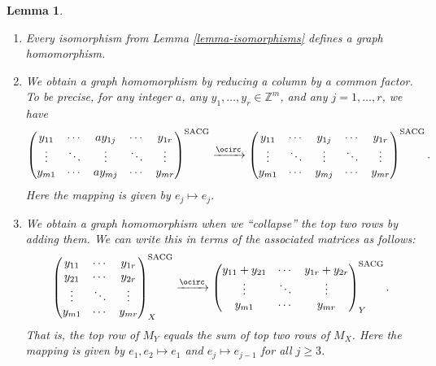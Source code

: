 \documentclass{article}
\newtheorem{Lem}[Thm]{Lemma}
\theoremstyle{definition}
\theoremstyle{remark}
\begin{document}
\begin{Lem}\label{lemma-homomorphisms}\;

\begin{enumerate}

\item Every isomorphism from Lemma \ref{lemma-isomorphisms} defines a graph homomorphism.

\item\label{lemma-homomorphisms-reduce-factor} We obtain a graph homomorphism by reducing a column by a common factor.  To be precise, for any integer $a$, any  $y_1,\dots,y_r\in \mathbb{Z}^m$, and any $j=1,\dots,r$, we have \[
\begin{pmatrix}y_{11} & \cdots & ay_{1j} & \cdots & y_{1r}\\
\vdots & \ddots & \vdots & \ddots & \vdots \\
y_{m1} & \cdots & ay_{mj} & \cdots &  y_{mr}\end{pmatrix}^{\text{SACG}}
    \xrightarrow{\ocirc}
    \begin{pmatrix}y_{11} & \cdots & y_{1j} & \cdots & y_{1r}\\
\vdots & \ddots & \vdots & \ddots & \vdots \\
y_{m1} & \cdots & y_{mj} & \cdots &  y_{mr}\end{pmatrix}^{\text{SACG}}.
\]  Here the mapping is given by $e_j\mapsto e_j$.

\item\label{lemma-homomorphisms-add-rows} We obtain a graph homomorphism when we ``collapse'' the top two rows by adding them.  We can write this in terms of the associated matrices as follows:\[
\begin{pmatrix}y_{11} & \cdots & y_{1r}\\
y_{21} & \cdots & y_{2r}\\
\vdots & \ddots & \vdots \\
y_{m1} & \cdots & y_{mr}\end{pmatrix}^{\text{SACG}}_X
    \xrightarrow{\ocirc}
    \begin{pmatrix}
    y_{11}+y_{21} & \cdots & y_{1r}+y_{2r}\\
\vdots & \ddots & \vdots \\
y_{m1} & \cdots & y_{mr}
    \end{pmatrix}^{\text{SACG}}_Y.
\]That is, the top row of $M_Y$ equals the sum of top two rows of $M_X$.  Here the mapping is given by $e_1, e_2\mapsto e_1$ and $e_j\mapsto e_{j-1}$ for all $j\geq 3$.

\end{enumerate}
\end{Lem}
\end{document}
